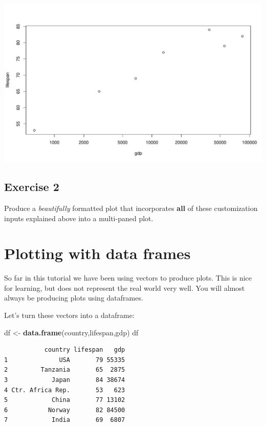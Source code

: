 \documentclass[
]{book}
\newenvironment{Shaded}{\begin{snugshade}}{\end{snugshade}}
\newcommand{\KeywordTok}[1]{\textcolor[rgb]{0.13,0.29,0.53}{\textbf{#1}}}
\newcommand{\NormalTok}[1]{#1}
\newcommand{\StringTok}[1]{\textcolor[rgb]{0.31,0.60,0.02}{#1}}
\begin{document}
\includegraphics{figures/unnamed-chunk-99-1.pdf}

\hypertarget{exercise-2-2}{%
\subsection*{Exercise 2}\label{exercise-2-2}}

Produce a \emph{beautifully} formatted plot that incorporates \textbf{all} of these customization inputs explained above into a multi-paned plot.

\hypertarget{plotting-with-data-frames}{%
\section*{Plotting with data frames}\label{plotting-with-data-frames}}

So far in this tutorial we have been using vectors to produce plots. This is nice for learning, but does not represent the real world very well. You will almost always be producing plots using dataframes.

Let's turn these vectors into a dataframe:

\begin{Shaded}
\begin{Highlighting}[]
\NormalTok{df <-}\StringTok{ }\KeywordTok{data.frame}\NormalTok{(country,lifespan,gdp)}
\NormalTok{df}
\end{Highlighting}
\end{Shaded}

\begin{verbatim}
           country lifespan   gdp
1              USA       79 55335
2         Tanzania       65  2875
3            Japan       84 38674
4 Ctr. Africa Rep.       53   623
5            China       77 13102
6           Norway       82 84500
7            India       69  6807
\end{verbatim}
\end{document}
